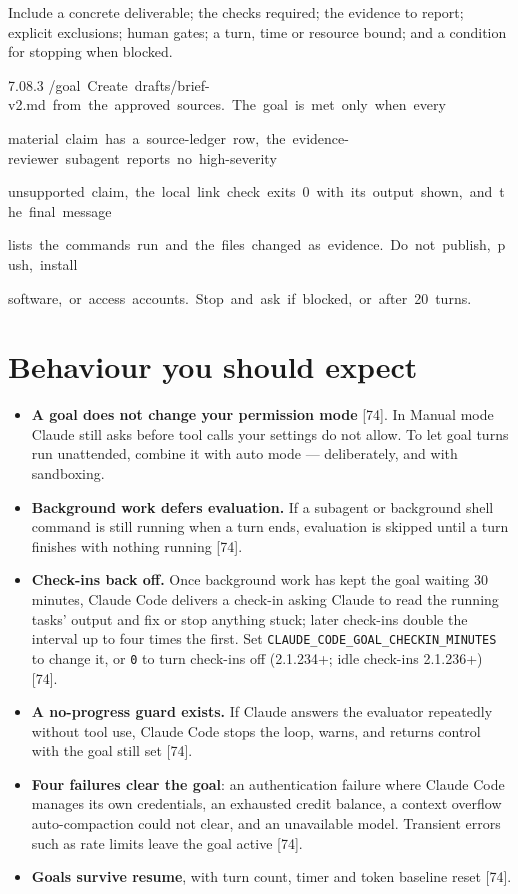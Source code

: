 \documentclass[11pt,a4paper,twoside,openany]{book}
\newcommand{\cl}[1]{\noindent\mbox{#1}\par}
\begin{document}
Include a concrete deliverable; the checks required; the evidence to report; explicit exclusions; human gates; a turn, time or resource bound; and a condition for stopping when blocked.


\begin{codeblock}{7.0}{8.3}
\cl{/goal~Create~drafts/brief-v2.md~from~the~approved~sources.~The~goal~is~met~only~when~every}
\cl{material~claim~has~a~source-ledger~row,~the~evidence-reviewer~subagent~reports~no~high-severity}
\cl{unsupported~claim,~the~local~link~check~exits~0~with~its~output~shown,~and~the~final~message}
\cl{lists~the~commands~run~and~the~files~changed~as~evidence.~Do~not~publish,~push,~install}
\cl{software,~or~access~accounts.~Stop~and~ask~if~blocked,~or~after~20~turns.}
\end{codeblock}

\FloatBarrier
\setcounter{section}{2}
\section{Behaviour you should expect}

\begin{itemize}
\item \textbf{A goal does not change your permission mode} [74]. In Manual mode Claude still asks before tool calls your settings do not allow. To let goal turns run unattended, combine it with auto mode — deliberately, and with sandboxing.
\item \textbf{Background work defers evaluation.} If a subagent or background shell command is still running when a turn ends, evaluation is skipped until a turn finishes with nothing running [74].
\item \textbf{Check-ins back off.} Once background work has kept the goal waiting 30 minutes, Claude Code delivers a check-in asking Claude to read the running tasks' output and fix or stop anything stuck; later check-ins double the interval up to four times the first. Set \texttt{CLAUDE\_\allowbreak{}CODE\_\allowbreak{}GOAL\_\allowbreak{}CHECKIN\_\allowbreak{}MINUTES} to change it, or \texttt{0} to turn check-ins off (2.1.234+; idle check-ins 2.1.236+) [74].
\item \textbf{A no-progress guard exists.} If Claude answers the evaluator repeatedly without tool use, Claude Code stops the loop, warns, and returns control with the goal still set [74].
\item \textbf{Four failures clear the goal}: an authentication failure where Claude Code manages its own credentials, an exhausted credit balance, a context overflow auto-compaction could not clear, and an unavailable model. Transient errors such as rate limits leave the goal active [74].
\item \textbf{Goals survive resume}, with turn count, timer and token baseline reset [74].
\end{itemize}
\end{document}

